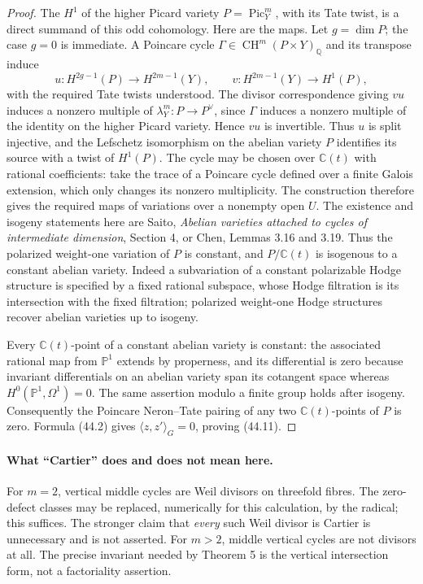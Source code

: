 \begin{proof}
The $H^1$ of the higher Picard variety $P=\operatorname{Pic}^m_Y$,
with its Tate twist, is a direct summand of this odd cohomology.
Here are the maps.  Let $g=\dim P$; the case $g=0$ is immediate.
A Poincare cycle $\Gamma\in\operatorname{CH}^{m}(P\times Y)_{\mathbb Q}$
and its transpose induce
\[
 u:H^{2g-1}(P)\longrightarrow H^{2m-1}(Y),\qquad
 v:H^{2m-1}(Y)\longrightarrow H^1(P),
\]
with the required Tate twists understood.  The divisor
correspondence giving $vu$ induces a nonzero multiple of
$\lambda_Y^m:P\to P^\vee$, since $\Gamma$ induces a nonzero
multiple of the identity on the higher Picard variety.  Hence
$vu$ is invertible.  Thus $u$ is split injective, and the
Lefschetz isomorphism on the abelian variety $P$ identifies its
source with a twist of $H^1(P)$.  The cycle may be chosen over
$\mathbb C(t)$ with rational coefficients: take the trace of a
Poincare cycle defined over a finite Galois extension, which only
changes its nonzero multiplicity.  The construction therefore
gives the required maps of variations over a nonempty open $U$.
The existence and isogeny statements here are Saito,
\emph{Abelian varieties attached to cycles of intermediate
dimension}, Section 4, or Chen, Lemmas 3.16 and 3.19.
Thus the polarized weight-one variation of $P$ is constant, and
$P/\mathbb C(t)$ is isogenous to a constant abelian variety.
Indeed a subvariation of a constant polarizable Hodge structure
is specified by a fixed rational subspace, whose Hodge filtration
is its intersection with the fixed filtration; polarized weight-one
Hodge structures recover abelian varieties up to isogeny.

Every $\mathbb C(t)$-point of a constant abelian variety is constant:
the associated rational map from $\mathbb P^1$ extends by properness,
and its differential is zero because invariant differentials on
an abelian variety span its cotangent space whereas
$H^0(\mathbb P^1,\Omega^1)=0$.  The same assertion modulo a finite
group holds after isogeny.  Consequently the Poincare Neron--Tate
pairing of any two $\mathbb C(t)$-points of $P$ is zero.  Formula
(44.2) gives $\langle z,z'\rangle_G=0$, proving (44.11).
\end{proof}

\paragraph{What ``Cartier'' does and does not mean here.}
For $m=2$, vertical middle cycles are Weil divisors on threefold
fibres.  The zero-defect classes may be replaced, numerically for
this calculation, by the radical; this suffices.  The stronger
claim that \emph{every} such Weil divisor is Cartier is unnecessary
and is not asserted.  For $m>2$, middle vertical cycles are not
divisors at all.  The precise invariant needed by Theorem 5 is
the vertical intersection form, not a factoriality assertion.

